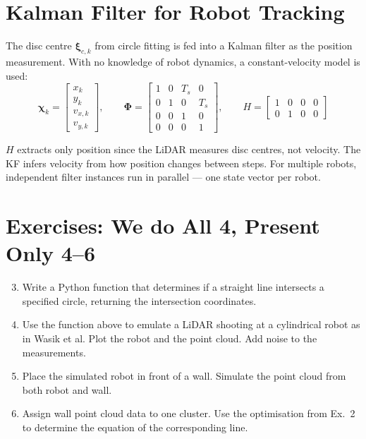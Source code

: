 \documentclass[12pt, a4paper]{article}
\begin{document}
\section*{Kalman Filter for Robot Tracking}

The disc centre $\boldsymbol{\xi}_{c,k}$ from circle fitting is fed into a
Kalman filter as the position measurement. With no knowledge of robot dynamics,
a constant-velocity model is used:
\[
  \boldsymbol{\chi}_k =
  \begin{bmatrix} x_k \\ y_k \\ v_{x,k} \\ v_{y,k} \end{bmatrix},
  \qquad
  \boldsymbol{\Phi} =
  \begin{bmatrix}
    1 & 0 & T_s & 0  \\
    0 & 1 & 0   & T_s\\
    0 & 0 & 1   & 0  \\
    0 & 0 & 0   & 1
  \end{bmatrix},
  \qquad
  H =
  \begin{bmatrix}
    1 & 0 & 0 & 0 \\
    0 & 1 & 0 & 0
  \end{bmatrix}
\]

$H$ extracts only position since the LiDAR measures disc centres, not velocity.
The KF infers velocity from how position changes between steps.
For multiple robots, independent filter instances run in parallel --- one
state vector per robot.

\clearpage
\section*{Exercises: We do All 4, Present Only 4--6}
\vspace{-0.5cm}
\begin{enumerate}
  \setcounter{enumi}{2}
  \item Write a Python function that determines if a straight line intersects
        a specified circle, returning the intersection coordinates.
  \item Use the function above to emulate a LiDAR shooting at a cylindrical
        robot as in Wasik et al. Plot the robot and the point cloud.
        Add noise to the measurements.
  \item Place the simulated robot in front of a wall.
        Simulate the point cloud from both robot and wall.
  \item Assign wall point cloud data to one cluster. Use the optimisation
        from Ex.\ 2 to determine the equation of the corresponding line.
\end{enumerate}
\end{document}
